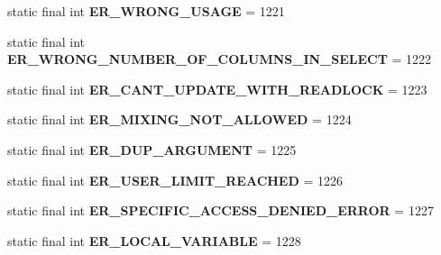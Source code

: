 \begin{DoxyCompactItemize}
static final int {\bfseries E\+R\+\_\+\+W\+R\+O\+N\+G\+\_\+\+U\+S\+A\+GE} = 1221
\item 
\mbox{\label{classcom_1_1mysql_1_1jdbc_1_1_mysql_error_numbers_a5936163f2d553e77a8c3415f39bce54a}} 
static final int {\bfseries E\+R\+\_\+\+W\+R\+O\+N\+G\+\_\+\+N\+U\+M\+B\+E\+R\+\_\+\+O\+F\+\_\+\+C\+O\+L\+U\+M\+N\+S\+\_\+\+I\+N\+\_\+\+S\+E\+L\+E\+CT} = 1222
\item 
\mbox{\label{classcom_1_1mysql_1_1jdbc_1_1_mysql_error_numbers_af42f4673809d8a42c57237bd8919c41b}} 
static final int {\bfseries E\+R\+\_\+\+C\+A\+N\+T\+\_\+\+U\+P\+D\+A\+T\+E\+\_\+\+W\+I\+T\+H\+\_\+\+R\+E\+A\+D\+L\+O\+CK} = 1223
\item 
\mbox{\label{classcom_1_1mysql_1_1jdbc_1_1_mysql_error_numbers_a5450478b1aa1efddb6b40069dfac5ceb}} 
static final int {\bfseries E\+R\+\_\+\+M\+I\+X\+I\+N\+G\+\_\+\+N\+O\+T\+\_\+\+A\+L\+L\+O\+W\+ED} = 1224
\item 
\mbox{\label{classcom_1_1mysql_1_1jdbc_1_1_mysql_error_numbers_a2cdbe93d779a903bd873f531645ea354}} 
static final int {\bfseries E\+R\+\_\+\+D\+U\+P\+\_\+\+A\+R\+G\+U\+M\+E\+NT} = 1225
\item 
\mbox{\label{classcom_1_1mysql_1_1jdbc_1_1_mysql_error_numbers_a6cf35ab20c0f5dba008c0b8187ee170e}} 
static final int {\bfseries E\+R\+\_\+\+U\+S\+E\+R\+\_\+\+L\+I\+M\+I\+T\+\_\+\+R\+E\+A\+C\+H\+ED} = 1226
\item 
\mbox{\label{classcom_1_1mysql_1_1jdbc_1_1_mysql_error_numbers_a1b192313197aac0c246cc7737cb75285}} 
static final int {\bfseries E\+R\+\_\+\+S\+P\+E\+C\+I\+F\+I\+C\+\_\+\+A\+C\+C\+E\+S\+S\+\_\+\+D\+E\+N\+I\+E\+D\+\_\+\+E\+R\+R\+OR} = 1227
\item 
\mbox{\label{classcom_1_1mysql_1_1jdbc_1_1_mysql_error_numbers_a4f6ac44fc8ac6cdcf61950aa510bfbe7}} 
static final int {\bfseries E\+R\+\_\+\+L\+O\+C\+A\+L\+\_\+\+V\+A\+R\+I\+A\+B\+LE} = 1228
\item 

\end{DoxyCompactItemize}
